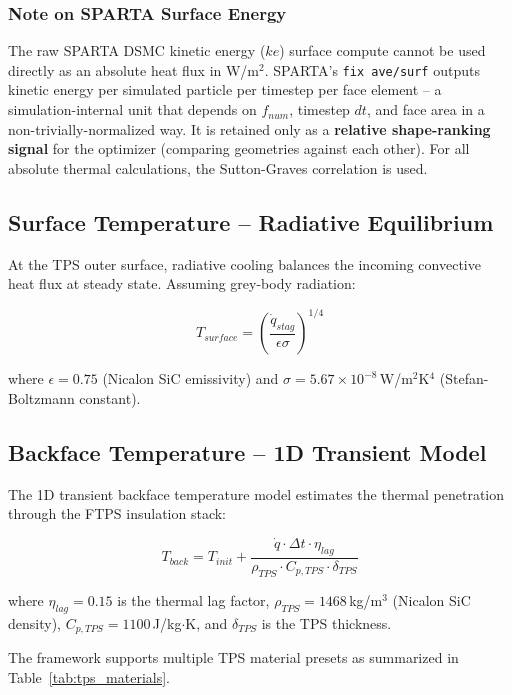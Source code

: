 \subsubsection*{Note on SPARTA Surface Energy}
The raw SPARTA DSMC kinetic energy ($ke$) surface compute cannot be used directly as an absolute heat flux in W/m$^2$. SPARTA's \texttt{fix ave/surf} outputs kinetic energy per simulated particle per timestep per face element -- a simulation-internal unit that depends on $f_{num}$, timestep $dt$, and face area in a non-trivially-normalized way. It is retained only as a \textbf{relative shape-ranking signal} for the optimizer (comparing geometries against each other). For all absolute thermal calculations, the Sutton-Graves correlation is used.

\subsection{Surface Temperature -- Radiative Equilibrium}
At the TPS outer surface, radiative cooling balances the incoming convective heat flux at steady state. Assuming grey-body radiation:

\begin{equation}
    T_{surface} = \left(\frac{\dot{q}_{stag}}{\epsilon \sigma}\right)^{1/4}
\end{equation}

where $\epsilon = 0.75$ (Nicalon SiC emissivity) and $\sigma = 5.67 \times 10^{-8}$\,W/m$^2$K$^4$ (Stefan-Boltzmann constant).

\subsection{Backface Temperature -- 1D Transient Model}
The 1D transient backface temperature model estimates the thermal penetration through the FTPS insulation stack:

\begin{equation}
    T_{back} = T_{init} + \frac{\dot{q} \cdot \Delta t \cdot \eta_{lag}}{\rho_{TPS} \cdot C_{p,TPS} \cdot \delta_{TPS}}
\end{equation}

where $\eta_{lag} = 0.15$ is the thermal lag factor, $\rho_{TPS} = 1468$\,kg/m$^3$ (Nicalon SiC density), $C_{p,TPS} = 1100$\,J/kg$\cdot$K, and $\delta_{TPS}$ is the TPS thickness.

The framework supports multiple TPS material presets as summarized in Table~\ref{tab:tps_materials}.

